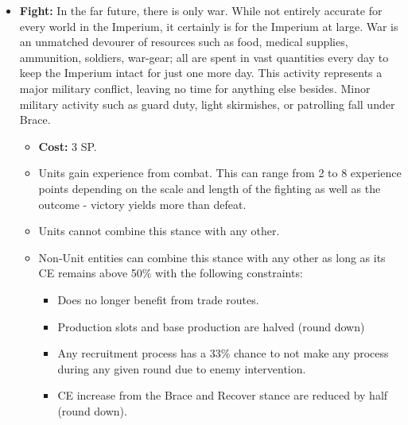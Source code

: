 \begin{itemize}
	\item \textbf{Fight:} In the far future, there is only war. While not entirely accurate for every world in the Imperium, it certainly is for the Imperium at large. War is an unmatched devourer of resources such as food, medical supplies, ammunition, soldiers, war-gear; all are spent in vast quantities every day to keep the Imperium intact for just one more day. 
	This activity represents a major military conflict, leaving no time for anything else besides. Minor military activity such as guard duty, light skirmishes, or patrolling fall under Brace.
	\begin{itemize}
		\item \textbf{Cost:} 3 SP.
		\item Units gain experience from combat. This can range from 2 to 8 experience points depending on the scale and length of the fighting as well as the outcome - victory yields more than defeat.
		\item Units cannot combine this stance with any other.
		\item Non-Unit entities can combine this stance with any other as long as its CE remains above 50\% with the following constraints: 
		\begin{itemize}
			\item Does no longer benefit from trade routes.
			\item Production slots and base production are halved (round down)
			\item Any recruitment process has a 33\% chance to not make any process during any given round due to enemy intervention.
			\item CE increase from the Brace and Recover stance are reduced by half (round down).
		\end{itemize}
	\end{itemize}
	

\end{itemize}
